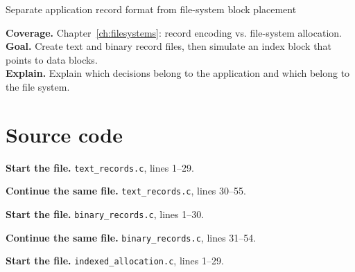 \begin{labproject}{Separate application record format from file-system block placement}

\textbf{Coverage.} Chapter~\ref{ch:filesystems}: record encoding vs. file-system allocation.\\
\textbf{Goal.} Create text and binary record files, then simulate an index block that points to data blocks.\\
\textbf{Explain.} Explain which decisions belong to the application and which belong to the file system.




\section*{Source code}
\noindent\textbf{Start the file.} \texttt{text\_records.c}, lines 1--29.



\noindent\textbf{Continue the same file.} \texttt{text\_records.c}, lines 30--55.


\noindent\textbf{Start the file.} \texttt{binary\_records.c}, lines 1--30.


\noindent\textbf{Continue the same file.} \texttt{binary\_records.c}, lines 31--54.


\noindent\textbf{Start the file.} \texttt{indexed\_allocation.c}, lines 1--29.


\end{labproject}
